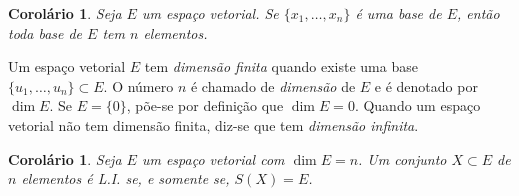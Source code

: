 \documentclass[12pt,a4paper]{article}
\newtheorem{cor}[thm]{Corolário}
\theoremstyle{definition}
\begin{document}
\begin{cor}
  Seja $E$ um espaço vetorial. Se $\{x_1,\ldots,x_n\}$ é uma base de
  $E$, então toda base de $E$ tem $n$ elementos.
\end{cor}

Um espaço vetorial $E$ tem \textit{dimensão finita} quando existe uma base
$\{u_1,\ldots,u_n\}\subset E$. O número $n$ é chamado de
\textit{dimensão} de $E$ e é denotado por $\dim E$. Se $E=\{0\}$,
põe-se por definição que $\dim E=0$. Quando um espaço vetorial não tem
dimensão finita, diz-se que tem \textit{dimensão infinita}.

\begin{cor}
  Seja $E$ um espaço vetorial com $\dim E=n$. Um conjunto $X\subset E$
  de $n$ elementos é L.I. se, e somente se, $S(X)=E$.
\end{cor}
\end{document}
